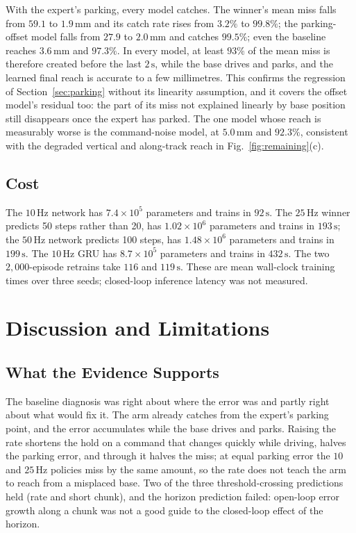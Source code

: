 \documentclass[conference]{IEEEtran}
\begin{document}
With the expert's parking, every model catches. The winner's mean miss falls from $59.1$ to $1.9\,\mathrm{mm}$ and its catch rate rises from $3.2\%$ to $99.8\%$; the parking-offset model falls from $27.9$ to $2.0\,\mathrm{mm}$ and catches $99.5\%$; even the baseline reaches $3.6\,\mathrm{mm}$ and $97.3\%$. In every model, at least $93\%$ of the mean miss is therefore created before the last $2\,\mathrm{s}$, while the base drives and parks, and the learned final reach is accurate to a few millimetres. This confirms the regression of Section~\ref{sec:parking} without its linearity assumption, and it covers the offset model's residual too: the part of its miss not explained linearly by base position still disappears once the expert has parked. The one model whose reach is measurably worse is the command-noise model, at $5.0\,\mathrm{mm}$ and $92.3\%$, consistent with the degraded vertical and along-track reach in Fig.~\ref{fig:remaining}(c).

\subsection{Cost}
The $10\,\mathrm{Hz}$ network has $7.4\times 10^{5}$ parameters and trains in $92\,\mathrm{s}$. The $25\,\mathrm{Hz}$ winner predicts 50 steps rather than 20, has $1.02\times 10^{6}$ parameters and trains in $193\,\mathrm{s}$; the $50\,\mathrm{Hz}$ network predicts 100 steps, has $1.48\times 10^{6}$ parameters and trains in $199\,\mathrm{s}$. The $10\,\mathrm{Hz}$ GRU has $8.7\times 10^{5}$ parameters and trains in $432\,\mathrm{s}$. The two $2{,}000$-episode retrains take $116$ and $119\,\mathrm{s}$. These are mean wall-clock training times over three seeds; closed-loop inference latency was not measured.

\section{Discussion and Limitations}
\subsection{What the Evidence Supports}
The baseline diagnosis was right about where the error was and partly right about what would fix it. The arm already catches from the expert's parking point, and the error accumulates while the base drives and parks. Raising the rate shortens the hold on a command that changes quickly while driving, halves the parking error, and through it halves the miss; at equal parking error the $10$ and $25\,\mathrm{Hz}$ policies miss by the same amount, so the rate does not teach the arm to reach from a misplaced base. Two of the three threshold-crossing predictions held (rate and short chunk), and the horizon prediction failed: open-loop error growth along a chunk was not a good guide to the closed-loop effect of the horizon.
\end{document}
